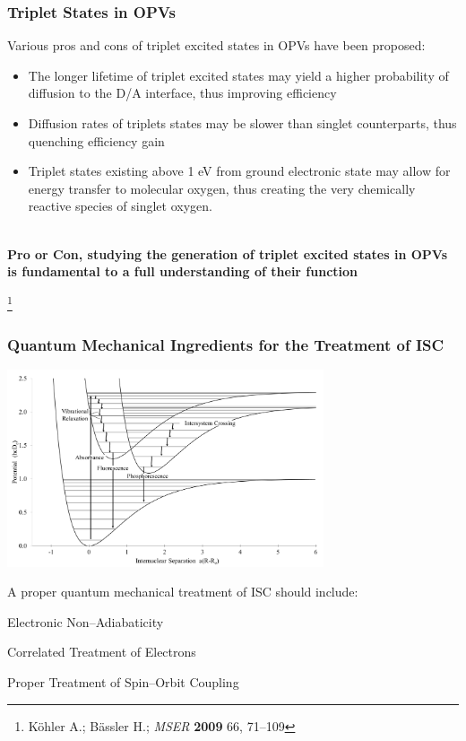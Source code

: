 \documentclass[usepdftitle=false,10pt]{beamer}
\newcommand{\cmark}{\color{green} \ding{51}}%
\newcommand{\xmark}{\color{red} \ding{55}}%
\newcommand{\done}{\rlap{$\square$}{\raisebox{2pt}{\large\hspace{1pt}\cmark}}%
\hspace{-2.5pt}}
\newcommand{\wontfix}{\rlap{$\square$}{\large\hspace{1pt}\xmark}}
\newcommand\blfootnote[1]{%
  \begingroup
  \renewcommand\thefootnote{}\footnote{#1}%
  \addtocounter{footnote}{-1}%
  \endgroup
}
\begin{document}
\begin{frame}
  \frametitle{Triplet States in OPVs}

  Various pros and cons of triplet excited states in OPVs have been proposed:
  \begin{itemize}
    \item[\done] The longer lifetime of triplet excited states may yield a higher probability of diffusion
          to the D/A interface, thus improving efficiency
    \item[\wontfix] Diffusion rates of triplets states may be slower than singlet counterparts, thus quenching
          efficiency gain
    \item[\wontfix] Triplet states existing above 1 eV from ground electronic state may allow for energy transfer
          to molecular oxygen, thus creating the very chemically reactive species of singlet oxygen.
  \end{itemize}

  \begin{center}
  ~\\
  {\Large \bf Pro or Con, studying the generation of triplet excited states in OPVs is fundamental to a full understanding
  of their function}
  \end{center}

  \blfootnote{\tiny K\"{o}hler A.; B\"{a}ssler H.; \emph{MSER} \textbf{2009} 66, 71--109}
\end{frame}

\begin{frame}
  \frametitle{Quantum Mechanical Ingredients for the Treatment of ISC}
  \begin{center}
  \includegraphics[width=0.7\textwidth]{ISC} 
  \end{center}
  \vspace{-0.5cm}
  A proper quantum mechanical treatment of ISC should include:\\
  \begin{mylist}
    \item Electronic Non--Adiabaticity
    \item Correlated Treatment of Electrons
    \item Proper Treatment of Spin--Orbit Coupling
  \end{mylist}
\end{frame}
\end{document}
